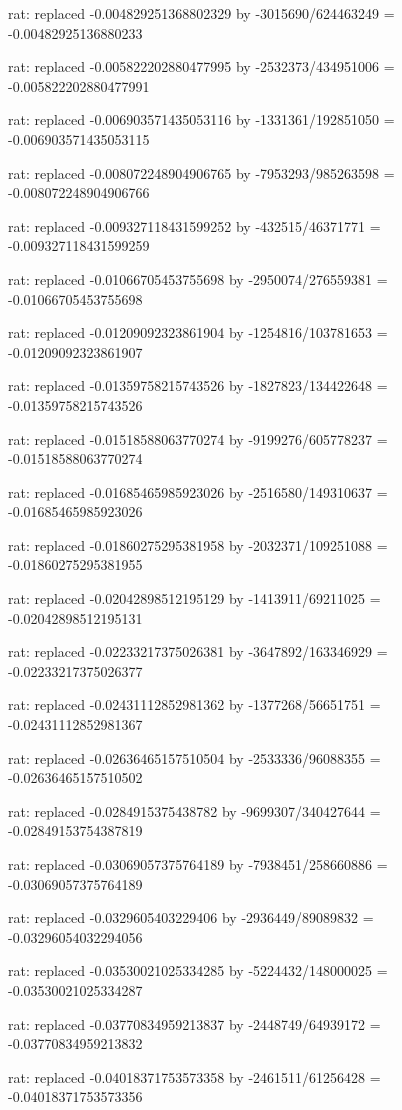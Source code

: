 \documentclass[a4paper,10pt]{article}
\begin{document}
\begin{eulernotebook}
\begin{eulercomment}
\begin{eulercomment}
\begin{eulercomment}
\begin{eulercomment}
\begin{eulercomment}
\begin{eulercomment}
\begin{eulercomment}
\begin{eulercomment}
\begin{eulercomment}
\begin{eulercomment}
\begin{eulercomment}
\begin{eulercomment}
\begin{eulercomment}
\begin{eulercomment}
\begin{eulercomment}
\begin{eulercomment}
\begin{euleroutput}
  rat: replaced -0.004829251368802329 by -3015690/624463249 = -0.00482925136880233
  
  rat: replaced -0.005822202880477995 by -2532373/434951006 = -0.005822202880477991
  
  rat: replaced -0.006903571435053116 by -1331361/192851050 = -0.006903571435053115
  
  rat: replaced -0.008072248904906765 by -7953293/985263598 = -0.008072248904906766
  
  rat: replaced -0.009327118431599252 by -432515/46371771 = -0.009327118431599259
  
  rat: replaced -0.01066705453755698 by -2950074/276559381 = -0.01066705453755698
  
  rat: replaced -0.01209092323861904 by -1254816/103781653 = -0.01209092323861907
  
  rat: replaced -0.01359758215743526 by -1827823/134422648 = -0.01359758215743526
  
  rat: replaced -0.01518588063770274 by -9199276/605778237 = -0.01518588063770274
  
  rat: replaced -0.01685465985923026 by -2516580/149310637 = -0.01685465985923026
  
  rat: replaced -0.01860275295381958 by -2032371/109251088 = -0.01860275295381955
  
  rat: replaced -0.02042898512195129 by -1413911/69211025 = -0.02042898512195131
  
  rat: replaced -0.02233217375026381 by -3647892/163346929 = -0.02233217375026377
  
  rat: replaced -0.02431112852981362 by -1377268/56651751 = -0.02431112852981367
  
  rat: replaced -0.02636465157510504 by -2533336/96088355 = -0.02636465157510502
  
  rat: replaced -0.0284915375438782 by -9699307/340427644 = -0.02849153754387819
  
  rat: replaced -0.03069057375764189 by -7938451/258660886 = -0.03069057375764189
  
  rat: replaced -0.0329605403229406 by -2936449/89089832 = -0.03296054032294056
  
  rat: replaced -0.03530021025334285 by -5224432/148000025 = -0.03530021025334287
  
  rat: replaced -0.03770834959213837 by -2448749/64939172 = -0.03770834959213832
  
  rat: replaced -0.04018371753573358 by -2461511/61256428 = -0.04018371753573356
  

\end{euleroutput}
\end{eulercomment}
\end{eulercomment}
\end{eulercomment}
\end{eulercomment}
\end{eulercomment}
\end{eulercomment}
\end{eulercomment}
\end{eulercomment}
\end{eulercomment}
\end{eulercomment}
\end{eulercomment}
\end{eulercomment}
\end{eulercomment}
\end{eulercomment}
\end{eulercomment}
\end{eulercomment}
\end{eulernotebook}
\end{document}
